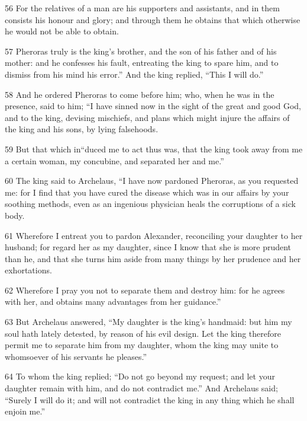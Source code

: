 \par 56 For the relatives of a man are his supporters and assistants, and in them consists his honour and glory; and through them he obtains that which otherwise he would not be able to obtain. 

\par 57 Pheroras truly is the king’s brother, and the son of his father and of his mother: and he confesses his fault, entreating the king to spare him, and to dismiss from his mind his error.” And the king replied, “This I will do.” 

\par 58 And he ordered Pheroras to come before him; who, when he was in the presence, said to him; “I have sinned now in the sight of the great and good God, and to the king, devising mischiefs, and plans which might injure the affairs of the king and his sons, by lying falsehoods. 

\par 59 But that which in“duced me to act thus was, that the king took away from me a certain woman, my concubine, and separated her and me.” 

\par 60 The king said to Archelaus, “I have now pardoned Pheroras, as you requested me: for I find that you have cured the disease which was in our affairs by your soothing methods, even as an ingenious physician heals the corruptions of a sick body. 

\par 61 Wherefore I entreat you to pardon Alexander, reconciling your daughter to her husband; for regard her as my daughter, since I know that she is more prudent than he, and that she turns him aside from many things by her prudence and her exhortations. 

\par 62 Wherefore I pray you not to separate them and destroy him: for he agrees with her, and obtains many advantages from her guidance.” 

\par 63 But Archelaus answered, “My daughter is the king’s handmaid: but him my soul hath lately detested, by reason of his evil design. Let the king therefore permit me to separate him from my daughter, whom the king may unite to whomsoever of his servants he pleases.” 

\par 64 To whom the king replied; “Do not go beyond my request; and let your daughter remain with him, and do not contradict me.” And Archelaus said; “Surely I will do it; and will not contradict the king in any thing which he shall enjoin me.” 

